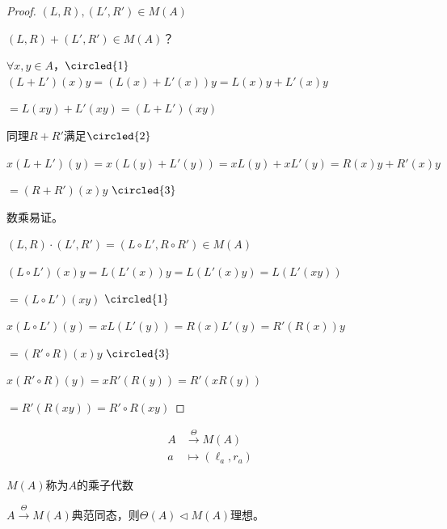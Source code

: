 \documentclass[lang=cn,a4paper,newtx,section]{elegantbook}
\begin{document}
\begin{proof}
  $(L, R), (L', R') \in M(A)$
  
  $(L, R) + (L', R') \in M(A)$？
  
  $\forall x, y \in A$，$\circled{1}$ $(L + L')(x)y = (L(x) + L'(x))y = L(x)y + L'(x)y$
  
  $= L(xy) + L'(xy) = (L + L')(xy)$
  
  同理$R + R'$满足$\circled{2}$
  
  $x(L + L')(y) = x(L(y) + L'(y)) = xL(y) + xL'(y) = R(x)y + R'(x)y$
  
  $= (R + R')(x)y$ $\circled{3}$
  
  数乘易证。
  
  $(L, R) \cdot (L', R') = (L \circ L', R \circ R') \in M(A)$
  
  $(L \circ L')(x)y = L(L'(x))y = L(L'(x)y) = L(L'(xy))$
  
  $= (L \circ L')(xy)$ $\circled{1}$
  
  $x(L \circ L')(y) = xL(L'(y)) = R(x)L'(y) = R'(R(x))y$
  
  $= (R' \circ R)(x)y$ $\circled{3}$
  
  $x(R' \circ R)(y) = xR'(R(y)) = R'(xR(y))$
  
  $= R'(R(xy)) = R' \circ R(xy)$
\end{proof}

\begin{definition}[典范同态]
  \begin{equation*}
    \begin{aligned}
      A &\xrightarrow{\Theta} M(A) \\
      a &\longmapsto (\ell_a, r_a)
    \end{aligned}
  \end{equation*}
  
  $M(A)$称为$A$的乘子代数
\end{definition}

\begin{proposition}
  $A \xrightarrow{\Theta} M(A)$典范同态，则$\Theta(A) \triangleleft M(A)$理想。
\end{proposition}
\end{document}
